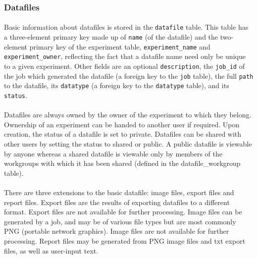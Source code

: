 \subsubsection{Datafiles}
\label{sec:model_datafiles}

\paragraph{}
Basic information about datafiles is stored in the \texttt{datafile} table. This table has a three-element primary key made up of \texttt{name} (of the datafile) and the two-element primary key of the experiment table, \texttt{experiment\_name} and \texttt{experiment\_owner}, reflecting the fact that a datafile name need only be unique to a given experiment. Other fields are an optional \texttt{description}, the \texttt{job\_id} of the job which generated the datafile (a foreign key to the \texttt{job} table), the full \texttt{path} to the datafile, its \texttt{datatype} (a foreign key to the \texttt{datatype} table), and its \texttt{status}. 


\paragraph{}
Datafiles are always owned by the owner of the experiment to which they belong. Ownership of an experiment can be handed to another user if required. Upon creation, the status of a datafile is set to private. Datafiles can be shared with other users by setting the status to shared or public. A public datafile is viewable by anyone whereas a shared datafile is viewable only by members of the workgroups with which it has been shared (defined in the datafile\_workgroup table).
\paragraph{}
There are three extensions to the basic datafile: image files, export files and report files. Export files are the results of exporting datafiles to a different format. Export files are not available for further processing. Image files can be generated by a job, and may be of various file types but are most commonly PNG (portable network graphics). Image files are not available for further processing. Report files may be generated from PNG image files and txt export files, as well as user-input text. 
